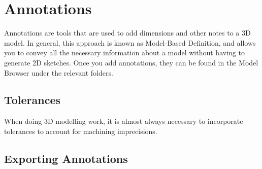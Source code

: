 \chapter{Annotations}

Annotations are tools that are used to add dimensions and other notes to a 3D model. In general, this approach is known as Model-Based Definition, and allows you to convey all the necessary information about a model without having to generate 2D sketches. Once you add annotations, they can be found in the Model Browser under the relevant folders.

\section{Tolerances}

When doing 3D modelling work, it is almost always necessary to incorporate tolerances to account for machining imprecisions.

\section{Exporting Annotations}